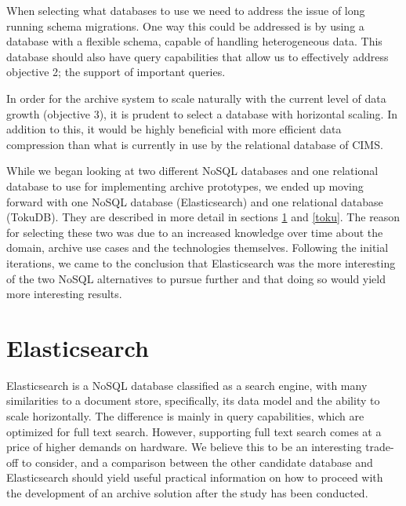 When selecting what databases to use we need to address the issue of long running schema migrations. One way this could be addressed is by using a database with a flexible schema, capable of handling heterogeneous data. This database should also have query capabilities that allow us to effectively address objective 2; the support of important queries.

In order for the archive system to scale naturally with the current level of data growth (objective 3), it is prudent to select a database with horizontal scaling. In addition to this, it would be highly beneficial with more efficient data compression than what is currently in use by the relational database of CIMS.

While we began looking at two different NoSQL databases and one relational database to use for implementing archive prototypes, we ended up moving forward with one NoSQL database (Elasticsearch) and one relational database (TokuDB). They are described in more detail in sections \ref{es} and \ref{toku}. The reason for selecting these two was due to an increased knowledge over time about the domain, archive use cases and the technologies themselves. Following the initial iterations, we came to the conclusion that Elasticsearch was the more interesting of the two NoSQL alternatives to pursue further and that doing so would yield more interesting results. 


\section{Elasticsearch}
\label{es}
Elasticsearch \cite{elastic} is a NoSQL database classified as a search engine, with many similarities to a document store, specifically, its data model and the ability to scale horizontally. The difference is mainly in query capabilities, which are optimized for full text search. However, supporting full text search comes at a price of higher demands on hardware. We believe this to be an interesting trade-off to consider, and a comparison between the other candidate database and Elasticsearch should yield useful practical information on how to proceed with the development of an archive solution after the study has been conducted.

